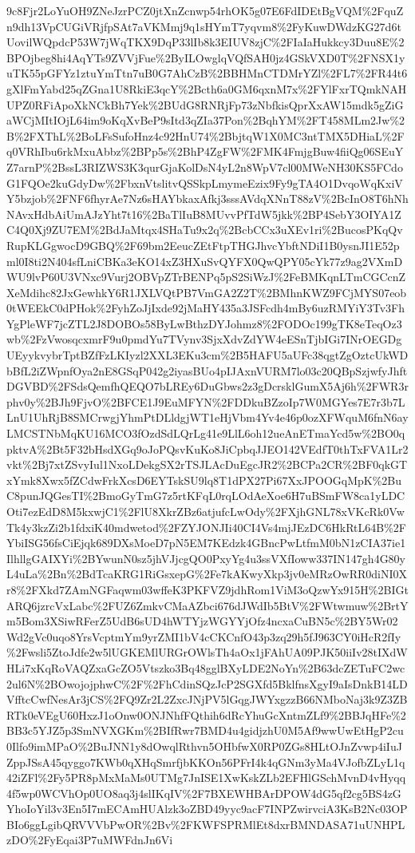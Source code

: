 \documentclass[11pt]{article}
\begin{document}
9c8Fjr2LoYuOH9ZNeJzrPCZ0jtXnZcnwp54rhOK5g07E6FdIDEtBgVQM\%2FquZn9dh13VpCUGiVRjfpSAt7aVKMmj9q1sHYmT7yqvm8\%2FyKuwDWdzKG27d6tUovilWQpdcP53W7jWqTKX9DqP33lIb8k3EIUV8zjC\%2FIaIaHukkcy3Duu8E\%2BPOjbeg8hi4AqYTs9ZVVjFue\%2ByILOwglqVQfSAH0jz4GSkVXD0T\%2FNSX1yuTK55pGFYz1ztuYmTtn7uB0G7AhCzB\%2BBHMnCTDMrYZl\%2FL7\%2FR44t6gXlFmYabd25qZGna1U8RkiE3qcY\%2Bcth6a0GM6qxnM7x\%2FYlFxrTQmkNAHUPZ0RFiApoXkNCkBh7Yek\%2BUdG8RNRjFp73zNbfkisQprXxAW15mdk5gZiGaWCjMItIOjL64im9oKqXvBeP9sItd3qZIa37Pon\%2BqhYM\%2FT458MLm2Jw\%2B\%2FXThL\%2BoLFsSufoHnz4c92HnU74\%2BbjtqW1X0MC3ntTMX5DHiaL\%2Fq0VRhIbu6rkMxuAbbz\%2BPp5s\%2BhP4ZgFW\%2FMK4FmjgBuw4fiiQg06SEuYZ7arnP\%2BssL3RIZWS3K3qurGjaKolDsN4yL2n8WpV7cl00MWeNH30KS5FCdoG1FQOe2kuGdyDw\%2FbxnVtslitvQSSkpLmymeEzix9Fy9gTA4O1DvqoWqKxiVY5bzjob\%2FNF6fhyrAe7Nz6sHAYbkaxAfkj3sssAVdqXNnT88zV\%2BcInO8T6hNhNAvxHdbAiUmAJzYht7t16\%2BaTlIuB8MUvvPfTdW5jkk\%2BP4SebY3OIYA1ZC4Q0Xj9ZU7EM\%2BdJaMtqx4SHaTu9x2q\%2BcbCCx3uXEv1ri\%2BucosPKqQvRupKLGgwocD9GBQ\%2F69bm2EeucZEtFtpTHGJhvcYbftNDiI1B0ysnJI1E52pml0I8ti2N404sfLniCBKa3eKO14xZ3HXuSvQYFX0QwQPY05cYk77z9ag2VXmDWU9lvP60U3VNxc9Vurj2OBVpZTrBENPq5pS2SiWzJ\%2FeBMKqnLTmCGCcnZXeMdihc82JxGewhkY6R1JXLVQtPB7VmGA2Z2T\%2BMhnKWZ9FCjMYS07eob0tWEEkC0dPHok\%2FyhZoJjIxde92jMaHY435a3JSFcdh4mBy6uzRMYiY3Tv3FhYgPleWF7jcZTL2J8DOBOs58ByLwBthzDYJohmz8\%2FODOc199gTK8eTeqOz3wb\%2FzVwosqcxmrF9u0pmdYu7TVynv3SjxXdvZdYW4eESnTjbIGi7INrOEGDgUEyykvybrTptBZfFzLKIyzl2XXL3EKu3cm\%2B5HAFU5aUFc38qgtZgOztcUkWDbBfL2iZWpnfOya2nE8GSqP042g2iyasBUo4pIJAxnVURM7lo03c20QBpSzjwfyJhftDGVBD\%2FSdsQemfhQEQO7bLREy6DuGbws2z3gDcrsklGumX5Aj6h\%2FWR3rphv0y\%2BJh9FjvO\%2BFCE1J9EuMFYN\%2FDDkuBZzoIp7W0MGYes7E7r3b7LLnU1UhRjB8SMCrwgjYhmPtDLldgjWT1eHjVbm4Yv4e46p0ozXFWquM6fnN6ayLMCSTNbMqKU16MCO3fOzdSdLQrLg41e9LlL6oh12ueAnETmaYcd5w\%2BO0qpktvA\%2Bt5F32bHsdXGq9oJoPQsvKuKo8JiCpbqJJEO142VEdfT0thTxFVA1Lr2vkt\%2Bj7xtZSvyIul1NxoLDekgSX2rTSJLAcDuEgcJR2\%2BCPa2CR\%2BF0qkGTxYmk8Xwx5fZCdwFrkXcsD6EYTskSU9lq8T1dPX27Pi67XxJPOOGqMpK\%2BuC8punJQGesTI\%2BmoGyTmG7z5rtKFqL0rqLOdAeXoe6H7uBSmFW8ca1yLDCOti7ezEdD8M5kxwjC1\%2FlU8XkrZBz6atjufcLwOdy\%2FXjhGNL78xVKcRk0VwTk4y3kzZi2b1fdxiK40mdwetod\%2FZYJONJIi40CI4Vs4mjJEzDC6HkRtL64B\%2FYbiISG56fsCiEjqk689DXsMoeD7pN5EM7KEdzk4GBncPwLtfmM0bN1zCIA37ie1IlhllgGAIXYi\%2BYwunN0sz5jhVJjcgQO0PxyYg4u3ssVXfIoww337IN147gh4G80yL4uLa\%2Bn\%2BdTcaKRG1RiGsxepG\%2Fe7kAKwyXkp3jv0eMRzOwRR0diNI0Xr8\%2FXkd7ZAmNGFaqwm03wffeK3PKFVZ9jdhRom1ViM3oQzwYx915H\%2BIGtARQ6jzrcVxLabc\%2FUZ6ZmkvCMaAZbci676dJWdIb5BtV\%2FWtwmuw\%2BrtYm5Bom3XSiwRFerZ5UdB6sUD4hWTYjzWGYYjOfz4ncxaCuBN5c\%2BY5Wr02Wd2gVc0uqo8YrsVcptmYm9yrZMI1bV4cCKCnfO43p3zq29h5fJ963CY0iHcR2fIy\%2Fwsli5ZtoJdfe2w5lUGKEMlURGrOWlsTh4aOx1jFAhUA09PJK50iiIv28tIXdWHLi7xKqRoVAQZxaGcZO5Vtszko3Bq48gglBXyLDE2NoYn\%2B63dcZETuFC2wc2ul6N\%2BOwojojphwC\%2F\%2FhCdinSQzJcP2SGXfd5BklfnsXgyI9aIsDnkB14LDVfftcCwfNesAr3jCS\%2FQ9Zr2L2ZxcJNjPV5lGqgJWYxgzzB66NMboNaj3k9Z3ZBRTk0eVEgU60HxzJ1oOnw0ONJNhfFQthih6dRcYhuGcXntmZLf9\%2BBJqHFe\%2BB3c5YJZ5p3SmNVXGKm\%2BIfRwr7BMD4u4gidjzhU0M5Af9wwUwEtHgP2cu0Ilfo9imMPaO\%2BuJNN1y8dOwqlRthvn5OHbfwX0RP0ZGs8HLtOJnZvwp4iIuJZppJSsA45qyggo7KWb0qXHqSmrfjbKKOn56PFrI4k4qGNm3yMa4VJofbZLyL1q42iZFl\%2Fy5PR8pMxMaMs0UTMg7JnISE1XwKskZLb2EFHlGSchMvnD4vHyqq4f5wp0WCVhOp0UO8aq3j4slIKqIV\%2F7BXEWHBArDPOW4dG5qf2cg5BS4zGYhoIoYil3v3En5I7mECAmHUAlzk3oZBD49yyc9acF7INPZwirvciA3KsB2Nc03OPBIo6ggLgibQRVVVbPwOR\%2Bv\%2FKWFSPRMlEt8dxrBMNDASA71uUNHPLzDO\%2FyEqai3P7uMWFdnJn6Vi
\end{document}
